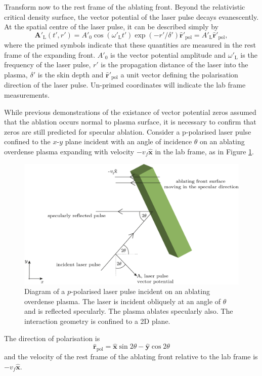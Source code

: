 Transform now to the rest frame of the ablating front. Beyond the relativistic critical density surface, the vector potential of the laser pulse decays evanescently. At the spatial centre of the laser pulse, it can be described simply by
\begin{equation}
	\mathbf{A}'_\mathrm{L}(t',r') = A'_0\cos(\omega'_\mathrm{L}t')\exp(-r'/\delta')\hat{\mathbf{r}}'_\mathrm{pol}= A'_\mathrm{L}\hat{\mathbf{r}}'_\mathrm{pol},
\end{equation}
where the primed symbols indicate that these quantities are measured in the rest frame of the expanding front. $A'_0$ is the vector potential amplitude and $\omega'_\mathrm{L}$ is the frequency of the laser pulse, $r'$ is the propagation distance of the laser into the plasma, $\delta'$ is the skin depth and $\hat{\mathbf{r}}'_\mathrm{pol}$ a unit vector defining the polarisation direction of the laser pulse. Un-primed coordinates will indicate the lab frame measurements.


While previous demonstrations of the existance of vector potential zeros assumed that the ablation occurs normal to plasma surface, it is necessary to confirm that zeros are still predicted for specular ablation. Consider a p-polarised laser pulse confined to the $x$-$y$ plane incident with an angle of incidence $\theta$ on an ablating overdense plasma expanding with velocity $-v_f\hat{\mathbf{x}}$ in the lab frame, as in Figure \ref{fig:zvp_ablatingfront}.

\begin{figure}
	\centering
	\includegraphics[width=0.7\linewidth]{figures/zvp/zvp_ablating_front}
	\caption[Diagram of a $p$-polarised laser pulse incident on an ablating overdense plasma.]{Diagram of a $p$-polarised laser pulse incident on an ablating overdense plasma. The laser is incident obliquely at an angle of $\theta$ and is reflected specularly. The plasma ablates specularly also. The interaction geometry is confined to a 2D plane.}
	\label{fig:zvp_ablatingfront}
\end{figure}
The direction of polarisation is
\begin{equation}
	\hat{\mathbf{r}}_\mathrm{pol} = \hat{\mathbf{x}}\sin{2\theta} - \hat{\mathbf{y}}\cos{2\theta}
\end{equation}
and the velocity of the rest frame of the ablating front relative to the lab frame is $-v_f\hat{\mathbf{x}}$.

